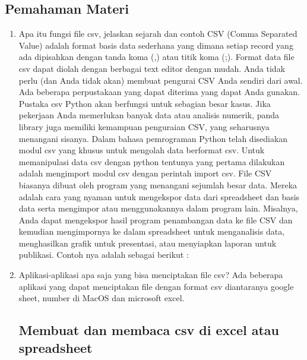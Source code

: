 \subsection{Pemahaman Materi}
\begin{enumerate}
\item Apa itu fungsi file csv, jelaskan sejarah dan contoh
 CSV (Comma Separated Value) adalah format basis data sederhana yang dimana setiap record yang ada dipisahkan dengan tanda koma (,) atau titik koma (;). Format data file csv dapat diolah dengan berbagai text editor dengan mudah. Anda tidak perlu (dan Anda tidak akan) membuat pengurai CSV Anda sendiri dari awal. Ada beberapa perpustakaan yang dapat diterima yang dapat Anda gunakan. Pustaka csv Python akan berfungsi untuk sebagian besar kasus. Jika pekerjaan Anda memerlukan banyak data atau analisis numerik, panda library juga memiliki kemampuan penguraian CSV, yang seharusnya menangani sisanya. Dalam bahasa pemrograman Python telah disediakan modul csv yang khusus untuk mengolah data berformat csv.  Untuk memanipulasi data csv dengan python tentunya yang pertama dilakukan adalah mengimport modul csv dengan perintah import csv. File CSV biasanya dibuat oleh program yang menangani sejumlah besar data. Mereka adalah cara yang nyaman untuk mengekspor data dari spreadsheet dan basis data serta mengimpor atau menggunakannya dalam program lain. Misalnya, Anda dapat mengekspor hasil program penambangan data ke file CSV dan kemudian mengimpornya ke dalam spreadsheet untuk menganalisis data, menghasilkan grafik untuk presentasi, atau menyiapkan laporan untuk publikasi. Contoh nya adalah sebagai berikut :

 

\item Aplikasi-aplikasi apa saja yang bisa menciptakan file csv?
 Ada beberapa aplikasi yang dapat menciptakan file dengan format csv diantaranya google sheet, number di MacOS dan microsoft excel.
\subsection{Membuat dan membaca csv di excel atau spreadsheet}


\end{enumerate}
